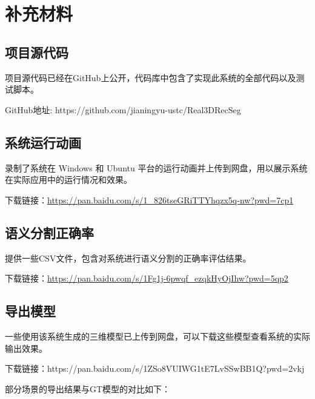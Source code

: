 
\chapter{补充材料}

\section{项目源代码}
\par 项目源代码已经在GitHub上公开，代码库中包含了实现此系统的全部代码以及测试脚本。
\par GitHub地址: https://github.com/jianingyu-ustc/Real3DRecSeg

\section{系统运行动画}
\par 录制了系统在 Windows 和 Ubuntu 平台的运行动画并上传到网盘，用以展示系统在实际应用中的运行情况和效果。
\par 下载链接：\href{https://pan.baidu.com/s/1_826tseGRiTTYhqzx5q-nw?pwd=7cp1}{https://pan.baidu.com/s/1\_826tseGRiTTYhqzx5q-nw?pwd=7cp1}

\section{语义分割正确率}
\par 提供一些CSV文件，包含对系统进行语义分割的正确率评估结果。
\par 下载链接：\href{https://pan.baidu.com/s/1Fg1j-6pwqf_ezqkHyOjIhw?pwd=5qp2}{https://pan.baidu.com/s/1Fg1j-6pwqf\_ezqkHyOjIhw?pwd=5qp2}

\section{导出模型}
\par 一些使用该系统生成的三维模型已上传到网盘，可以下载这些模型查看系统的实际输出效果。
\par 下载链接：https://pan.baidu.com/s/1ZSo8VUIWG1tE7LvSSwBB1Q?pwd=2vkj
\par 部分场景的导出结果与GT模型的对比如下：

